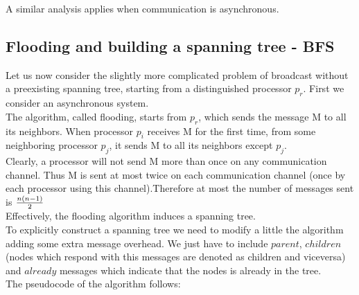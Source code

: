 \documentclass{article}
\begin{document}
A similar analysis applies when communication is asynchronous. 



\subsection{Flooding and building a spanning tree - BFS}
Let us now consider the slightly more complicated problem of broadcast 
without a preexisting spanning tree, starting from a distinguished processor $p_r$. First 
we consider an asynchronous system. \\
The algorithm, called flooding, starts from $p_r$, which sends the message M to all 
its neighbors. When processor $p_i$ receives M for the first time, from some neighboring processor $p_j$, it sends M to all its 
neighbors except $p_j$.\\
Clearly, a processor will not send M more than once on any communication 
channel. Thus M is sent at most twice on each communication channel (once 
by each processor using this channel).Therefore at most the number of messages sent is ${n(n-1) \over 2}$\\
Effectively, the flooding algorithm induces a spanning tree.\\
To explicitly construct a spanning tree we need to modify a little the algorithm adding some extra message overhead. We just have to include $parent$, $children$ (nodes which respond with this messages are denoted as children and viceversa)  and $already$ messages which indicate that the nodes is already in the tree.\\

The pseudocode of the algorithm follows:
\end{document}

